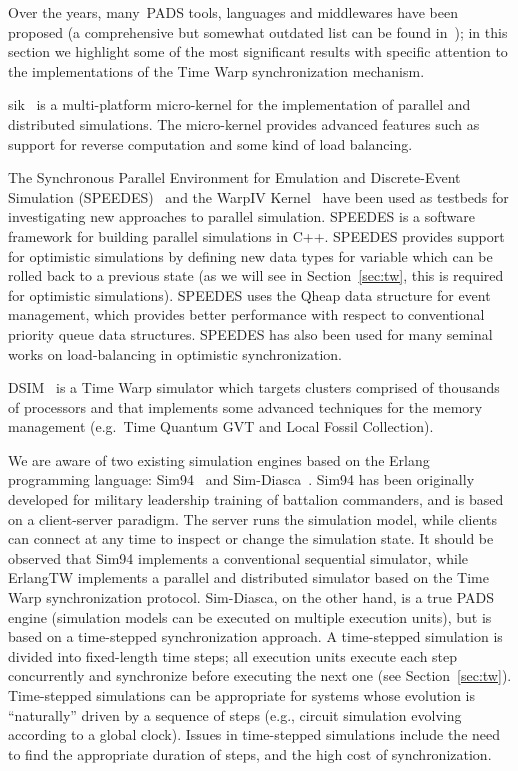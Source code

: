 \documentclass{sigplanconf}
\begin{document}
Over the years, many~\ac{PADS} tools, languages and
middlewares have been proposed (a comprehensive but somewhat outdated
list can be found in~\cite{Low99}); in this section we highlight some
of the most significant results with specific attention to the 
implementations of the Time Warp synchronization mechanism.

sik~\cite{Perumalla:2005:MPS:1069810.1070161} is a multi-platform
micro-kernel for the implementation of parallel and distributed
simulations. The micro-kernel provides advanced features such as
support for reverse computation and some kind of load balancing. 

The Synchronous Parallel Environment for Emulation and Discrete-Event
Simulation (SPEEDES)~\cite{Steinman:2003:SPF:824475.825880} and the
WarpIV Kernel~\cite{Steinman_08s-siw-025warpiv} have been used as
testbeds for investigating new approaches to parallel simulation.
SPEEDES is a software framework for building parallel simulations in
C++. SPEEDES provides support for optimistic simulations by defining
new data types for variable which can be rolled back to a previous
state (as we will see in Section~\ref{sec:tw}, this is required for
optimistic simulations). SPEEDES uses the Qheap data structure for
event management, which provides better performance with respect to
conventional priority queue data structures. SPEEDES has also been
used for many seminal works on load-balancing in optimistic
synchronization.

DSIM~\cite{chen2005} is a Time Warp simulator which targets clusters 
comprised of thousands of processors and that implements some advanced 
techniques for the memory management (e.g.~Time Quantum GVT and Local 
Fossil Collection).

We are aware of two existing simulation engines based on the Erlang
programming language: Sim94~\cite{sim94} and
Sim-Diasca~\cite{sim-diasca}. Sim94 has been originally developed for
military leadership training of battalion commanders, and is based on
a client-server paradigm. The server runs the simulation model, while
clients can connect at any time to inspect or change the simulation
state. It should be observed that Sim94 implements a conventional
sequential simulator, while ErlangTW implements a parallel and
distributed simulator based on the Time Warp synchronization protocol.
Sim-Diasca, on the other hand, is a true PADS engine (simulation
models can be executed on multiple execution units), but is based on a
time-stepped synchronization approach. A time-stepped simulation is
divided into fixed-length time steps; all execution units execute each
step concurrently and synchronize before executing the next one (see
Section~\ref{sec:tw}). Time-stepped simulations can be appropriate for
systems whose evolution is ``naturally'' driven by a sequence of steps
(e.g., circuit simulation evolving according to a global
clock). Issues in time-stepped simulations include the need to find
the appropriate duration of steps, and the high cost of
synchronization.
\end{document}
